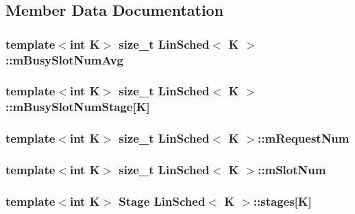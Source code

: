 \subsection{Member Data Documentation}
\hypertarget{classLinSched_a084c69c2890d7700e1ce14ed8da179e6}{
\subsubsection[{m\-Busy\-Slot\-Num\-Avg}]{\setlength{\rightskip}{0pt plus 5cm}template$<$int K$>$ size\-\_\-t {\bf Lin\-Sched}$<$ K $>$\-::m\-Busy\-Slot\-Num\-Avg\hspace{0.3cm}{\ttfamily [private]}}}\label{classLinSched_a084c69c2890d7700e1ce14ed8da179e6}
\hypertarget{classLinSched_ac64077553a7f146e98dbd84365c1a552}{
\subsubsection[{m\-Busy\-Slot\-Num\-Stage}]{\setlength{\rightskip}{0pt plus 5cm}template$<$int K$>$ size\-\_\-t {\bf Lin\-Sched}$<$ K $>$\-::m\-Busy\-Slot\-Num\-Stage\mbox{[}K\mbox{]}\hspace{0.3cm}{\ttfamily [private]}}}\label{classLinSched_ac64077553a7f146e98dbd84365c1a552}
\hypertarget{classLinSched_a864879d805b12ea6c2dd1641fc86ffbe}{
\subsubsection[{m\-Request\-Num}]{\setlength{\rightskip}{0pt plus 5cm}template$<$int K$>$ size\-\_\-t {\bf Lin\-Sched}$<$ K $>$\-::m\-Request\-Num\hspace{0.3cm}{\ttfamily [private]}}}\label{classLinSched_a864879d805b12ea6c2dd1641fc86ffbe}
\hypertarget{classLinSched_a851cef882cb7392a1887b0d77cb83ec8}{
\subsubsection[{m\-Slot\-Num}]{\setlength{\rightskip}{0pt plus 5cm}template$<$int K$>$ size\-\_\-t {\bf Lin\-Sched}$<$ K $>$\-::m\-Slot\-Num\hspace{0.3cm}{\ttfamily [private]}}}\label{classLinSched_a851cef882cb7392a1887b0d77cb83ec8}
\hypertarget{classLinSched_a825ee41205fa4e9dd53fc8f2ac444494}{
\subsubsection[{stages}]{\setlength{\rightskip}{0pt plus 5cm}template$<$int K$>$ {\bf Stage} {\bf Lin\-Sched}$<$ K $>$\-::stages\mbox{[}K\mbox{]}}}\label{classLinSched_a825ee41205fa4e9dd53fc8f2ac444494}


